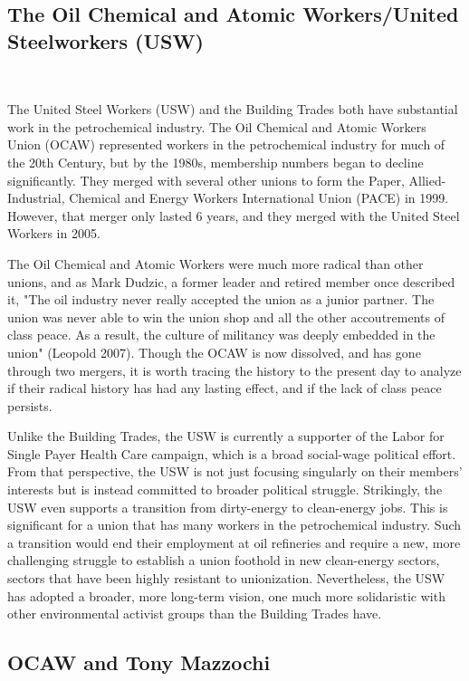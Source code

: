 \documentclass[12pt]{article}
\begin{document}

\subsection{The Oil Chemical and Atomic Workers/United Steelworkers (USW)} \

The United Steel Workers (USW) and the Building Trades both have substantial work in the petrochemical industry. The Oil Chemical and Atomic Workers Union (OCAW) represented workers in the petrochemical industry for much of the 20th Century, but by the 1980s, membership numbers began to decline significantly. They merged with several other unions to form the Paper, Allied-Industrial, Chemical and Energy Workers International Union (PACE) in 1999. However, that merger only lasted 6 years, and they merged with the United Steel Workers in 2005.

The Oil Chemical and Atomic Workers were much more radical than other unions, and as Mark Dudzic, a former leader and retired member once described it, "The oil industry never really accepted the union as a junior partner. The union was never able to win the union shop and all the other accoutrements of class peace. As a result, the culture of militancy was deeply embedded in the union" (Leopold 2007). Though the OCAW is now dissolved, and has gone through two mergers, it is worth tracing the history to the present day to analyze if their radical history has had any lasting effect, and if the lack of class peace persists.

Unlike the Building Trades, the USW is currently a supporter of the Labor for Single Payer Health Care campaign, which is a broad social-wage political effort. From that perspective, the USW is not just focusing singularly on their members’ interests but is instead committed to broader political struggle. Strikingly, the USW even supports a transition from dirty-energy to clean-energy jobs. This is significant for a union that has many workers in the petrochemical industry. Such a transition would end their employment at oil refineries and require a new, more challenging struggle to establish a union foothold in new clean-energy sectors, sectors that have been highly resistant to unionization. Nevertheless, the USW has adopted a broader, more long-term vision, one much more solidaristic with other environmental activist groups than the Building Trades have.

\subsection{OCAW and Tony Mazzochi} \
\end{document}
